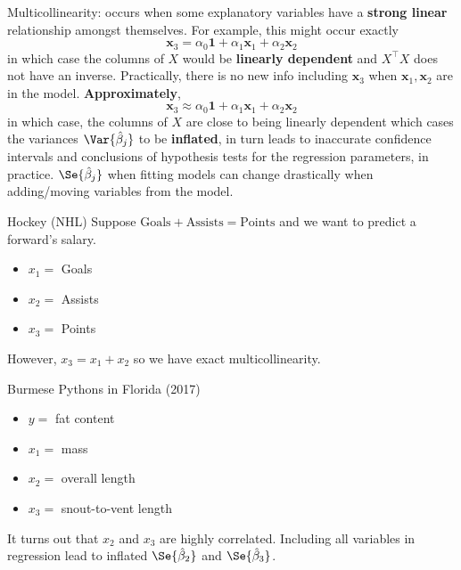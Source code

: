 Multicollinearity: occurs when some explanatory
variables have a \textbf{strong linear}
relationship amongst themselves. For example,
this might occur exactly
\[ \symbf{x}_3=\alpha_0\symbf{1}+\alpha_1\symbf{x}_1+\alpha_2\symbf{x}_2 \]
in which case the columns of $ X $ would be \textbf{linearly dependent}
and $ X^\top X $ does not have an inverse. Practically,
there is no new info including $ \symbf{x}_3 $
when $ \symbf{x}_1,\symbf{x}_2 $ are in the model.
\textbf{Approximately},
\[ \symbf{x}_3\approx \alpha_0\symbf{1}+\alpha_1\symbf{x}_1+\alpha_2\symbf{x}_2 \]
in which case, the columns of $ X $ are close to being
linearly dependent which cases the variances $ \Var{\hat{\beta}_j} $
to be \textbf{inflated}, in turn leads to inaccurate confidence
intervals and conclusions of hypothesis tests
for the regression parameters, in practice.
$ \Se{\hat{\beta}_j} $ when fitting models can change drastically
when adding/moving variables from the model.

\begin{Example}{Hockey (NHL)}{}
    Suppose $ \text{Goals}+\text{Assists}=\text{Points} $
    and we want to predict a forward's salary.
    \begin{itemize}
        \item $ x_1= $ Goals
        \item $ x_2= $ Assists
        \item $ x_3= $ Points
    \end{itemize}
    However, $ x_3=x_1+x_2 $ so we have exact multicollinearity.
\end{Example}
\begin{Example}{Burmese Pythons in Florida (2017)}{}
    \begin{itemize}
        \item $ y= $ fat content
        \item $ x_1= $ mass
        \item $ x_2= $ overall length
        \item $ x_3= $ snout-to-vent length
    \end{itemize}
    It turns out that $ x_2 $ and $ x_3 $ are highly
    correlated. Including all variables in
    regression lead to inflated $ \Se{\hat{\beta}_2} $
    and $ \Se{\hat{\beta}_3} $.
\end{Example}

